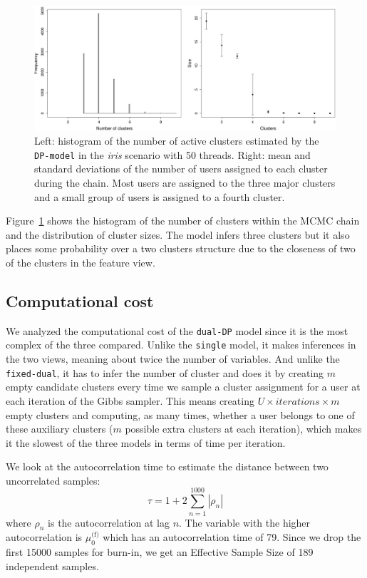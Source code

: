 \documentclass[smallextended]{svjour3}          %
\newcommand{\muo}{\mu_{0}^\text{(f)}}
\begin{document}
\begin{figure}
	\centering
	\includegraphics[width=1\textwidth]{Fig10_ncomponents}
	\caption{Left: histogram of the number of active clusters estimated by the \texttt{DP-model} in the \textit{iris} scenario with 50 threads. Right: mean and standard deviations of the number of users assigned to each cluster during the chain. Most users are assigned to the three major clusters and a small group of users is assigned to a fourth cluster.}
	\label{fig:nclusters}
\end{figure}

Figure~\ref{fig:nclusters} shows the histogram of the number of clusters within the MCMC chain and the distribution of cluster sizes. The model infers three clusters but it also places some probability over a two clusters structure due to the closeness of two of the clusters in the feature view.  

\subsection{Computational cost}\label{sec:cost}
We analyzed the computational cost of the \texttt{dual-DP} model since it is the most complex of the three compared. Unlike the \texttt{single} model, it makes inferences in the two views, meaning about twice the number of variables.  And unlike the \texttt{fixed-dual}, it has to infer the number of cluster and does it by creating $m$ empty candidate clusters every time we sample a cluster assignment for a user at each iteration of the Gibbs sampler. This means creating $U \times iterations \times m$ empty clusters and computing, as many times, whether a user belongs to one of these auxiliary clusters ($m$ possible extra clusters at each iteration), which makes it the slowest of the three models in terms of time per iteration.

We look at the autocorrelation time to estimate the distance between two uncorrelated samples:
\begin{equation*}
	\tau = 1 + 2\sum_{n=1}^{1000} |\rho_n|
\end{equation*} 
where $\rho_n$ is the autocorrelation at lag $n$. The variable with the higher autocorrelation is $\muo$ which has an autocorrelation time of 79. Since we drop the first 15000 samples for burn-in, we get an Effective Sample Size of 189 independent samples.
\end{document}
